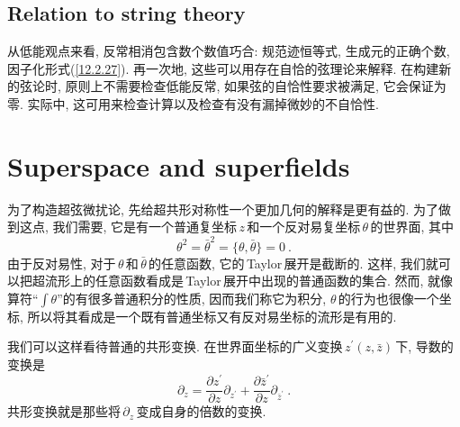 \subsection*{Relation to string theory}

从低能观点来看, 反常相消包含数个数值巧合: 规范迹恒等式, 生成元的正确个数, 因子化形式(\ref{12.2.27}). 再一次地, 这些可以用存在自恰的弦理论来解释. 在构建新的弦论时, 原则上不需要检查低能反常, 如果弦的自恰性要求被满足, 它会保证为零. 实际中, 这可用来检查计算以及检查有没有漏掉微妙的不自恰性.


\section{Superspace and superfields}

为了构造超弦微扰论, 先给超共形对称性一个更加几何的解释是更有益的. 为了做到这点, 我们需要{}, 它是有一个普通复坐标$\,z\,$和一个反对易复坐标$\,\theta\,$的世界面, 其中
\begin{equation}
    \theta^{2}=\bar{\theta}^{2} = \{\theta,\bar{\theta}\} = 0 \:. \label{12.3.1}
\end{equation}
由于反对易性, 对于$\,\theta\,$和$\,\bar{\theta}\,$的任意函数, 它的\,Taylor\,展开是截断的. 这样, 我们就可以把超流形上的任意函数看成是\,Taylor\,展开中出现的普通函数的集合. 然而, 就像算符``$\int\theta$''的有很多普通积分的性质, 因而我们称它为积分, $\theta\,$的行为也很像一个坐标, 所以将其看成是一个既有普通坐标又有反对易坐标的流形是有用的.

我们可以这样看待普通的共形变换. 在世界面坐标的广义变换$\,z^{\prime}(z,\bar{z})\,$下, 导数的变换是
\begin{equation}
    \partial_{z} = \frac{\partial z^{\prime}}{\partial z} \partial_{z^{\prime}}
    +\frac{\partial \bar{z}^{\prime}}{\partial z} \partial_{\bar{z}^{\prime}} \:.\label{12.3.2}
\end{equation}
共形变换就是那些将$\,\partial_{z}\,$变成自身的倍数的变换.

